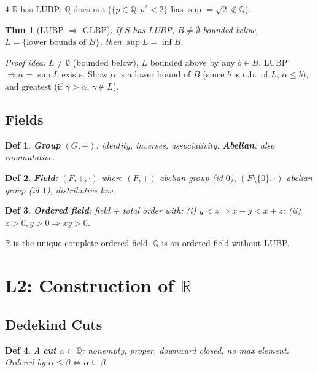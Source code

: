 \documentclass[9pt,landscape]{extarticle}
\newcommand{\R}{\mathbb{R}}
\newcommand{\Q}{\mathbb{Q}}
\theoremstyle{compact}
\newtheorem*{thm}{Thm}
\newtheorem*{defn}{Def}
\begin{document}
\begin{multicols}{4}
$\R$ has LUBP; $\Q$ does not ($\{p \in \Q : p^2 < 2\}$ has $\sup = \sqrt{2} \notin \Q$).

\begin{thm}[LUBP $\Rightarrow$ GLBP]
If $S$ has LUBP, $B \neq \emptyset$ bounded below, $L = \{\text{lower bounds of } B\}$, then $\sup L = \inf B$.
\end{thm}
\textit{Proof idea:} $L \neq \emptyset$ (bounded below), $L$ bounded above by any $b \in B$. LUBP $\Rightarrow \alpha = \sup L$ exists. Show $\alpha$ is a lower bound of $B$ (since $b$ is u.b.\ of $L$, $\alpha \leq b$), and greatest (if $\gamma > \alpha$, $\gamma \notin L$).

\subsection{Fields}
\begin{defn}
\textbf{Group} $(G,+)$: identity, inverses, associativity. \textbf{Abelian}: also commutative.
\end{defn}

\begin{defn}
\textbf{Field}: $(F,+,\cdot)$ where $(F,+)$ abelian group (id $0$), $(F\setminus\{0\},\cdot)$ abelian group (id $1$), distributive law.
\end{defn}

\begin{defn}
\textbf{Ordered field}: field + total order with: (i) $y < z \Rightarrow x+y < x+z$; (ii) $x>0, y>0 \Rightarrow xy > 0$.
\end{defn}

$\R$ is the unique complete ordered field. $\Q$ is an ordered field without LUBP.

\section{L2: Construction of $\R$}

\subsection{Dedekind Cuts}
\begin{defn}
A \textbf{cut} $\alpha \subset \Q$: nonempty, proper, downward closed, no max element. Ordered by $\alpha \leq \beta \Leftrightarrow \alpha \subseteq \beta$.
\end{defn}


\end{multicols}
\end{document}

